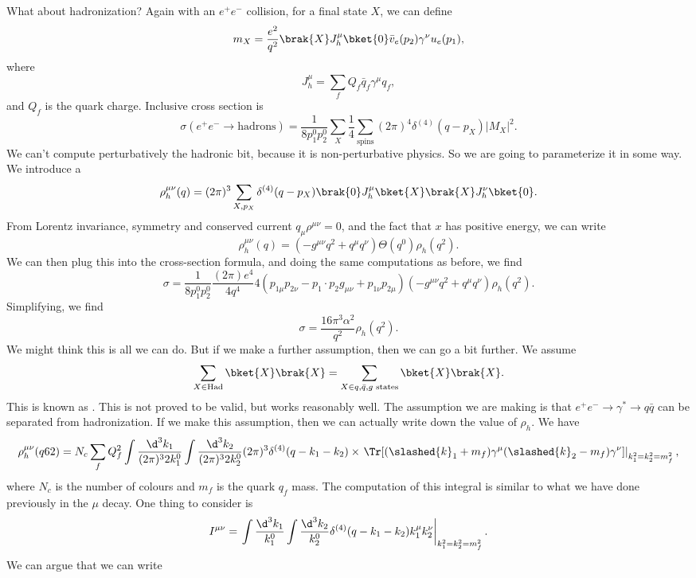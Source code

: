 \documentclass[a4paper]{article}
\begin{document}
What about hadronization? Again with an $e^+e^-$ collision, for a final state $X$, we can define
\[
  m_X = \frac{e^2}{q^2} \brak{X} J^\mu_h \bket{0} \bar{v}_e (p_2) \gamma^\nu u_e(p_1),
\]
where
\[
  J^\mu_h = \sum_f Q_f \bar{q}_f \gamma^\mu q_f,
\]
and $Q_f$ is the quark charge. Inclusive cross section is
\[
  \sigma(e^+ e^- \to \mathrm{hadrons}) = \frac{1}{8p_1^0 p_2^0} \sum_{X} \frac{1}{4} \sum_{\mathrm{spins}} (2\pi)^4 \delta^{(4)} (q - p_X) |M_X|^2.
\]
We can't compute perturbatively the hadronic bit, because it is non-perturbative physics. So we are going to parameterize it in some way. We introduce a 
\[
  \rho_h^{\mu\nu} (q) = (2\pi)^3 \sum_{X, p_X} \delta^{(4)} (q - p_X) \brak{0}J_h^\mu\bket{X} \brak{X}J_h^\nu\bket{0}.
\]
From Lorentz invariance, symmetry and conserved current $q_\mu \rho^{\mu\nu} = 0$, and the fact that $x$ has positive energy, we can write
\[
  \rho_h^{\mu\nu}(q) = (- g^{\mu\nu} q^2 + q^\mu q^\nu) \Theta(q^0) \rho_h (q^2).
\]
We can then plug this into the cross-section formula, and doing the same computations as before, we find
\[
  \sigma = \frac{1}{8 p_1^0 p_2^0} \frac{(2\pi) e^4}{4 q^4} 4 (p_{1\mu} p_{2\nu} - p_1 \cdot p_2 g_{\mu\nu} + p_{1\nu} p_{2\mu})(-g^{\mu\nu} q^2 + q^\mu q^\nu) \rho_h(q^2).
\]
Simplifying, we find
\[
  \sigma = \frac{16 \pi^3 \alpha^2}{q^2} \rho_h(q^2).
\]
We might think this is all we can do. But if we make a further assumption, then we can go a bit further. We assume
\[
  \sum_{X \in \mathrm{Had}}\bket{X}\brak{X} = \sum_{X \in q, \bar{q}, g\text{ states}} \bket{X}\brak{X}.
\]
This is known as . This is not proved to be valid, but works reasonably well. The assumption we are making is that $e^+ e^- \to \gamma^* \to q\bar{q}$ can be separated from hadronization. If we make this assumption, then we can actually write down the value of $\rho_h$. We have
\[
  \rho_h^{\mu\nu}(q62) = N_c \sum_f Q_f^2 \int \frac{\d^3 k_1}{(2\pi)^3 2 k_1^0} \int \frac{\d^3 k_2}{(2\pi)^3 2k_2^0} (2\pi)^3 \delta^{(4)}(q - k_1 - k_2) \times \left.\Tr [(\slashed{k}_1 + m_f) \gamma^\mu (\slashed{k}_2 - m_f) \gamma^{\nu}]\right|_{k_1^2 = k_2^2 = m_f^2}, %
\]
where $N_c$ is the number of colours and $m_f$ is the quark $q_f$ mass. The computation of this integral is similar to what we have done previously in the $\mu$ decay. One thing to consider is
\[
  I^{\mu\nu} = \left.\int \frac{\d^3 k_1}{k_1^0} \int \frac{\d^3 k_2}{k_2^0} \delta^{(4)}(q - k_1 - k_2) k_1^\mu k_2^\nu\right|_{k_1^2 = k_2^2 = m_f^2}.
\]
We can argue that we can write
\end{document}
